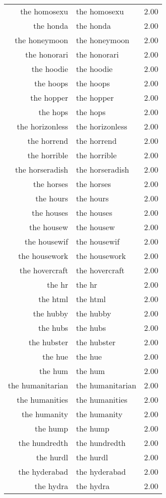 \begin{table}[ht]
\begin{tabular}{rlr}
  the homosexu & the homosexu & 2.00 \\ 
  the honda & the honda & 2.00 \\ 
  the honeymoon & the honeymoon & 2.00 \\ 
  the honorari & the honorari & 2.00 \\ 
  the hoodie & the hoodie & 2.00 \\ 
  the hoops & the hoops & 2.00 \\ 
  the hopper & the hopper & 2.00 \\ 
  the hops & the hops & 2.00 \\ 
  the horizonless & the horizonless & 2.00 \\ 
  the horrend & the horrend & 2.00 \\ 
  the horrible & the horrible & 2.00 \\ 
  the horseradish & the horseradish & 2.00 \\ 
  the horses & the horses & 2.00 \\ 
  the hours & the hours & 2.00 \\ 
  the houses & the houses & 2.00 \\ 
  the housew & the housew & 2.00 \\ 
  the housewif & the housewif & 2.00 \\ 
  the housework & the housework & 2.00 \\ 
  the hovercraft & the hovercraft & 2.00 \\ 
  the hr & the hr & 2.00 \\ 
  the html & the html & 2.00 \\ 
  the hubby & the hubby & 2.00 \\ 
  the hubs & the hubs & 2.00 \\ 
  the hubster & the hubster & 2.00 \\ 
  the hue & the hue & 2.00 \\ 
  the hum & the hum & 2.00 \\ 
  the humanitarian & the humanitarian & 2.00 \\ 
  the humanities & the humanities & 2.00 \\ 
  the humanity & the humanity & 2.00 \\ 
  the hump & the hump & 2.00 \\ 
  the hundredth & the hundredth & 2.00 \\ 
  the hurdl & the hurdl & 2.00 \\ 
  the hyderabad & the hyderabad & 2.00 \\ 
  the hydra & the hydra & 2.00 \\ 

\end{tabular}
\end{table}
